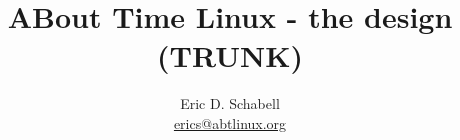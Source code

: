 \documentclass[a4paper]{article}
\begin{document}
\title{ABout Time Linux - the design\\ (TRUNK)}

\author{Eric D. Schabell \\ \url{erics@abtlinux.org}}

\maketitle






%  
\end{document}
